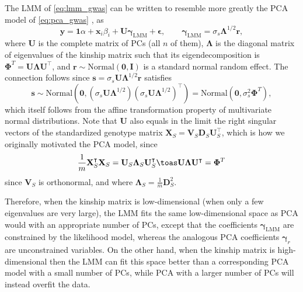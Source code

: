 \documentclass[11pt]{article}
\begin{document}
The LMM of \cref{eq:lmm_gwas} can be written to resemble more greatly the PCA model of \cref{eq:pca_gwas} \citep{astle_population_2009, hoffman_correcting_2013}, as
\begin{equation}
  \label{eq:lmm_gwas_evd}
  \mathbf{y}
  =
  \mathbf{1} \alpha + \mathbf{x}_i \beta_i + \mathbf{U} \boldsymbol{\gamma}_\text{LMM} + \boldsymbol{\epsilon}
  , \quad\quad
  \boldsymbol{\gamma}_\text{LMM} = \sigma_s \boldsymbol{\Lambda}^{1/2} \mathbf{r}
  ,
\end{equation}
where $\mathbf{U}$ is the complete matrix of PCs (all $n$ of them), $\boldsymbol{\Lambda}$ is the diagonal matrix of eigenvalues of the kinship matrix such that its eigendecomposition is $\mathbf{\Phi}^T = \mathbf{U} \boldsymbol{\Lambda} \mathbf{U}^\intercal$, and $\mathbf{r} \sim \text{Normal}(\mathbf{0},\mathbf{I})$ is a standard normal random effect.
The connection follows since $\mathbf{s} = \sigma_s \mathbf{U} \boldsymbol{\Lambda}^{1/2} \mathbf{r}$ satisfies
$$
\mathbf{s} \sim \text{Normal} \left( \mathbf{0}, \left( \sigma_s \mathbf{U} \boldsymbol{\Lambda}^{1/2} \right) \left( \sigma_s \mathbf{U} \boldsymbol{\Lambda}^{1/2} \right)^\intercal \right)
= \text{Normal}( \mathbf{0}, \sigma_s^2 \mathbf{\Phi}^T ),
$$
which itself follows from the affine transformation property of multivariate normal distributions.
Note that $\mathbf{U}$ also equals in the limit the right singular vectors of the standardized genotype matrix $\mathbf{X}_S = \mathbf{V}_S \mathbf{D}_S \mathbf{U}_S^\intercal$, which is how we originally motivated the PCA model, since
$$
\frac{1}{m} \mathbf{X}_S^\intercal \mathbf{X}_S
= \mathbf{U}_S \mathbf{\Lambda}_S \mathbf{U}_S^\intercal
\toas
\mathbf{U} \mathbf{\Lambda} \mathbf{U}^\intercal
=
\mathbf{\Phi}^T
$$
since $\mathbf{V}_S$ is orthonormal, and where $\mathbf{\Lambda}_S = \frac{1}{m} \mathbf{D}_S^2$.

Therefore, when the kinship matrix is low-dimensional (when only a few eigenvalues are very large), the LMM fits the same low-dimensional space as PCA would with an appropriate number of PCs, except that the coefficients $\boldsymbol{\gamma}_\text{LMM}$ are constrained by the likelihood model, whereas the analogous PCA coefficients $\boldsymbol{\gamma}_r$ are unconstrained variables.
On the other hand, when the kinship matrix is high-dimensional then the LMM can fit this space better than a corresponding PCA model with a small number of PCs, while PCA with a larger number of PCs will instead overfit the data.
\end{document}
